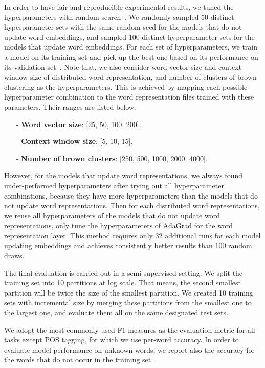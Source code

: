 In order to have fair and reproducible experimental results, we tuned the hyperparameters with random search~\cite{bergstra2012random}. We randomly sampled 50 distinct hyperparameter sets with the same random seed for the models that do not update word embeddings, and sampled 100 distinct hyperparameter sets for the models that update word embeddings.  For each set of hyperparameters, we train a model on its training set and pick up the best one based on its performance on its validation set~\cite{turian2010word}. Note that, we also consider word vector size and context window size of distributed word representation, and number of clusters of brown clustering as the hyperparameters. This is achieved by mapping each possible hyperparameter combination to the word representation files trained with these parameters. Their ranges are listed below.
\begin{small}
\begin{itemize}
\item[-]\textbf{Word vector size}: [25, 50, 100, 200].
\item[-]\textbf{Context window size}: [5, 10, 15].
\item[-]\textbf{Number of brown clusters}: [250, 500, 1000, 2000, 4000]. 
\end{itemize}
\end{small}

However, for the models that update word representations, we always found under-performed hyperparameters after trying out all hyperparameter combinations, because they have more hyperparameters than the models that do not update word representations. Then for each distributed word representations, we reuse all hyperparameters of the models that do not update word representations, only tune the hyperparameters of AdaGrad for the word representation layer. This method requires only 32 additional runs for each model updating embeddings and achieves consistently better results than 100 random draws.

The final evaluation is carried out in a semi-supervised setting. We split the training set into 10 partitions at log scale. That means, the second smallest partition will be twice the size of the smallest partition. We created 10 training sets with incremental size by merging these partitions from the smallest one to the largest one, and evaluate them all on the same designated test sets. 

We adopt the most commonly used F1 measures as the evaluation metric for all tasks except POS tagging, for which we use per-word accuracy. In order to evaluate model performance on unknown words, we report also the accuracy for the words that do not occur in the training set.

